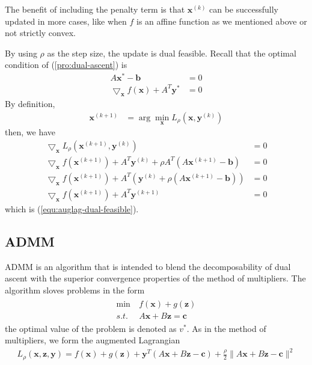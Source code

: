 The benefit of including the penalty term is that $\mathbf{x}^{(k)}$
can be successfully updated in more cases, like when
$f$ is an affine function as we mentioned above or not strictly convex.
\par
By using $\rho$ as the step size, the update is
dual feasible. Recall that the optimal condition of
(\ref{pro:dual-ascent}) is
\begin{align}
    A\mathbf{x}^* - \mathbf{b} &= 0 \\
    \bigtriangledown_\mathbf{x} f(\mathbf{x}) + A^T \mathbf{y}^* &= 0
\end{align}
By definition,
\begin{align}
    \mathbf{x}^{(k+1)} &= \arg\min_\mathbf{x}
    \label{equ:auglag-dual-feasible}
    L_\rho(\mathbf{x}, \mathbf{y}^{(k)})
\end{align}
then, we have
\begin{align}
    \bigtriangledown_\mathbf{x} L_\rho (\mathbf{x}^{(k+1)}, \mathbf{y}^{(k)}) &= 0 \\
    \bigtriangledown_\mathbf{x} f(\mathbf{x}^{(k+1)}) + 
    A^T \mathbf{y}^{(k)} + \rho A^T (A\mathbf{x}^{(k+1)} - \mathbf{b}) &= 0 \\
    \bigtriangledown_\mathbf{x} f(\mathbf{x}^{(k+1)}) + 
    A^T (\mathbf{y}^{(k)} + \rho (A\mathbf{x}^{(k+1)} - \mathbf{b})) &= 0 \\
    \bigtriangledown_\mathbf{x} f(\mathbf{x}^{(k+1)}) + 
    A^T \mathbf{y}^{(k+1)} &= 0
\end{align}
which is (\ref{equ:auglag-dual-feasible}).




\subsection{ADMM}
ADMM is an algorithm that is intended to blend the
decomposability of dual ascent with the superior
convergence properties of the method of multipliers.
The algorithm sloves problems in the form
\begin{align}
    \begin{array}{ll}
        \min \ &f(\mathbf{x}) + g(\mathbf{z}) \\
        s.t. \ &A\mathbf{x} + B\mathbf{z} = \mathbf{c}
    \end{array}
    \label{pro:admm}
\end{align}
the optimal value of the problem is denoted as $v^*$.
As in the method of multipliers, we form the augmented
Lagrangian
\begin{align}
    L_\rho (\mathbf{x}, \mathbf{z}, \mathbf{y}) = 
    f(\mathbf{x}) + g(\mathbf{z}) + \mathbf{y}^T
    (A\mathbf{x} + B\mathbf{z} - \mathbf{c}) +
    \frac{\rho}{2} \parallel
    A\mathbf{x} + B\mathbf{z} - \mathbf{c}
    \parallel^2
\end{align}


